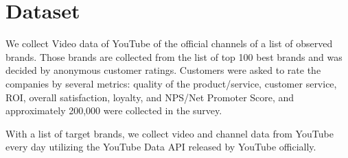 \section{Dataset}

We collect Video data of YouTube of the official channels of a list of observed brands. Those brands are collected from the list of top 100 best brands and was decided by anonymous customer ratings. Customers were asked to rate the companies by several metrics: quality of the product/service, customer service, ROI, overall satisfaction, loyalty, and NPS/Net Promoter Score, and approximately 200,000 were collected in the survey.

With a list of target brands, we collect video and channel data from YouTube every day utilizing the YouTube Data API released by YouTube officially.